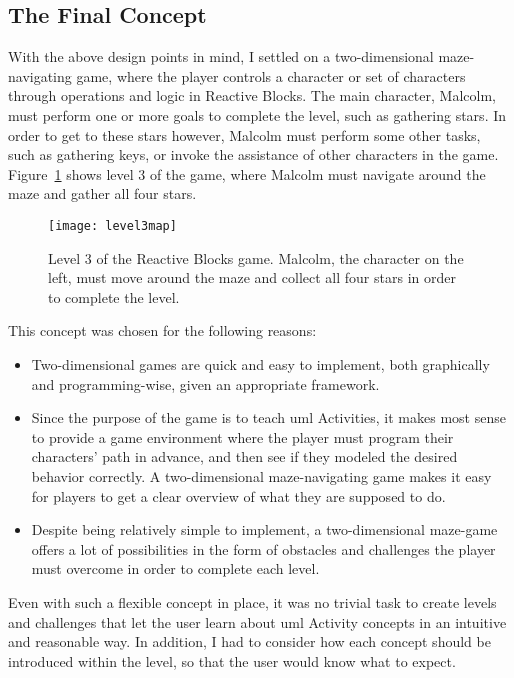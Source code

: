 \subsection{The Final Concept}
\label{sec:game_final_concept}
With the above design points in mind, I settled on a two-dimensional maze-navigating game, where the player controls a character or set of characters through operations and logic in Reactive Blocks. The main character, Malcolm, must perform one or more goals to complete the level, such as gathering stars. In order to get to these stars however, Malcolm must perform some other tasks, such as gathering keys, or invoke the assistance of other characters in the game. Figure~\ref{fig:level3map} shows level 3 of the game, where Malcolm must navigate around the maze and gather all four stars.

\begin{figure}[htp]
	\centering
	\texttt{[image: level3map]}
	\caption[Level 3 of the Reactive Blocks game]{Level 3 of the Reactive Blocks game. Malcolm, the character on the left, must move around the maze and collect all four stars in order to complete the level.}
	\label{fig:level3map}
\end{figure}

\noindent
This concept was chosen for the following reasons:
\begin{itemize}
	\item Two-dimensional games are quick and easy to implement, both graphically and programming-wise, given an appropriate framework.
	\item Since the purpose of the game is to teach \gls{uml} Activities, it makes most sense to provide a game environment where the player must program their characters' path in advance, and then see if they modeled the desired behavior correctly. A two-dimensional maze-navigating game makes it easy for players to get a clear overview of what they are supposed to do.
	\item Despite being relatively simple to implement, a two-dimensional maze-game offers a lot of possibilities in the form of obstacles and challenges the player must overcome in order to complete each level.
\end{itemize}

\noindent
Even with such a flexible concept in place, it was no trivial task to create levels and challenges that let the user learn about \gls{uml} Activity concepts in an intuitive and reasonable way. In addition, I had to consider how each concept should be introduced within the level, so that the user would know what to expect.

